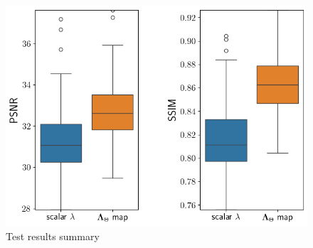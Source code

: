 \documentclass[12pt]{article}
\begin{document}





\begin{figure}[H]
  \centering
  \includegraphics[width=0.5\linewidth]{images//chest_xray/box_plots1.png}
  \caption{Test results summary}
  \label{fig:box_plots}
\end{figure}
\end{document}
